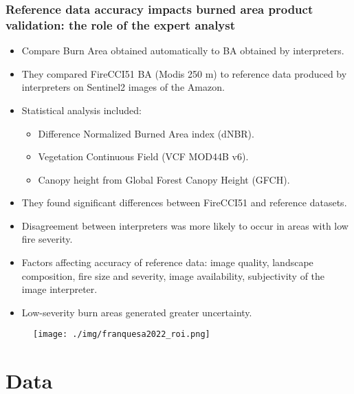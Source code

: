 \documentclass{beamer}
\begin{document}
\begin{frame}[t, allowframebreaks]
    \frametitle{Reference data accuracy impacts burned area product validation:
    the role of the expert analyst~\cite{franquesa2022}}
    \begin{itemize}
        \item Compare Burn Area obtained automatically to BA obtained by 
            interpreters.
        \item They compared FireCCI51 BA (Modis 250 m) to reference data 
            produced by interpreters on Sentinel2 images of the Amazon.
        \item Statistical analysis included:
            \begin{itemize}
                \item Difference Normalized Burned Area index (dNBR).
                \item Vegetation Continuous Field (VCF MOD44B v6).
                \item Canopy height from Global Forest Canopy Height (GFCH).
            \end{itemize}
        \item They found significant differences between FireCCI51 and 
            reference datasets.
        \item Disagreement between interpreters was more likely to occur in
            areas with low fire severity.
        \item Factors affecting accuracy of reference data: image quality,
            landscape composition, fire size and severity, image availability,
            subjectivity of the image interpreter.
        \item Low-severity burn areas generated greater uncertainty.
    \end{itemize}
    \begin{figure}
        \centering
        \texttt{[image: ./img/franquesa2022\_roi.png]}
    \end{figure}
\end{frame}



\section{Data}
\end{document}

